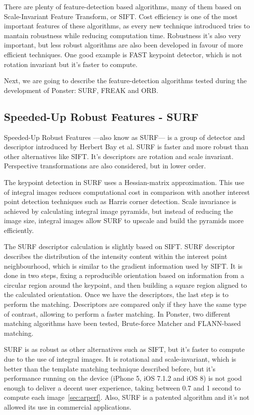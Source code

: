There are plenty of feature-detection based algorithms, many of them based on
Scale-Invariant Feature Transform, or SIFT. Cost efficiency is one of the most
important features of these algorithms, as every new technique introduced tries to
mantain robustness while reducing computation time. Robustness it's also very
important, but less robust algorithms are also been developed in favour of more
efficient techniques. One good example is FAST\cite{6126544} keypoint detector, which is
not rotation invariant but it's faster to compute.

Next, we are going to describe the feature-detection algorithms tested during the
development of Ponster: SURF, FREAK and ORB.

\subsection{Speeded-Up Robust Features - SURF}
Speeded-Up Robust Features ---also know as SURF--- is a group of detector and descriptor
introduced by Herbert Bay et al. SURF is faster and more robust than other
alternatives like SIFT\cite{Bay:2008:SRF:1370312.1370556}. It's descriptors are rotation and scale invariant.
Perspective transformations are also considered, but in lower order. 

The keypoint detection in SURF uses a Hessian-matrix approximation. This use of
integral images reduces computational cost in comparison with another interest point
detection techniques such as Harris corner detection. Scale invariance is achieved
by calculating integral image pyramids, but instead of reducing the image size,
integral images allow SURF to upscale and build the pyramids more efficiently. 

The SURF descriptor calculation is slightly based on SIFT. SURF descriptor describes
the distribution of the intensity content within the interest point neighbourhood,
which is similar to the gradient information used by SIFT. It is done in two steps,
fixing a reproducible orientation based on information from a circular region around
the keypoint, and then building a square region aligned to the calculated
orientation. Once we have the descriptors, the last step is to perform the
matching. Descriptors are compared only if they have the same type of contrast,
allowing to perform a faster matching. In Ponster, two different matching algorithms
have been tested, Brute-force Matcher and FLANN-based matching.

SURF is as robust as other alternatives such as SIFT, but it's faster to compute due
to the use of integral images. It is rotational and scale-invariant, which is better
than the template matching technique described before, but it's performance running
on the device (iPhone 5, iOS 7.1.2 and iOS 8) is not good enough to deliver a decent user
experience, taking between 0.7 and 1 second to compute each image~\ref{sec:arperf}. Also, SURF is a
patented algorithm and it's not allowed its use in commercial applications. 

